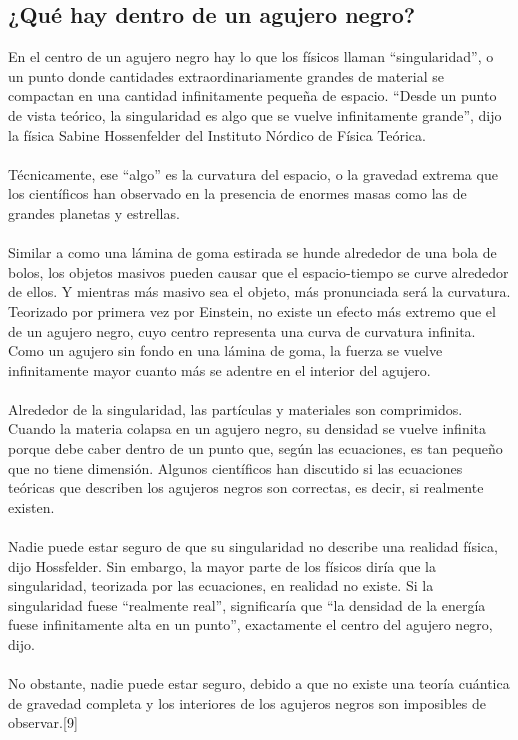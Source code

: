\documentclass[12pt]{article}
\begin{document}
\subsection{¿Qué hay dentro de un agujero negro?}
En el centro de un agujero negro hay lo que los físicos llaman “singularidad”, o un punto donde cantidades extraordinariamente grandes de material se compactan en una cantidad infinitamente pequeña de espacio.
“Desde un punto de vista teórico, la singularidad es algo que se vuelve infinitamente grande”, dijo la física Sabine Hossenfelder del Instituto Nórdico de Física Teórica.\\\\
Técnicamente, ese “algo” es la curvatura del espacio, o la gravedad extrema que los científicos han observado en la presencia de enormes masas como las de grandes planetas y estrellas.\\\\
Similar a como una lámina de goma estirada se hunde alrededor de una bola de bolos, los objetos masivos pueden causar que el espacio-tiempo se curve alrededor de ellos. Y mientras más masivo sea el objeto, más pronunciada será la curvatura. Teorizado por primera vez por Einstein, no existe un efecto más extremo que el de un agujero negro, cuyo centro representa una curva de curvatura infinita. Como un agujero sin fondo en una lámina de goma, la fuerza se vuelve infinitamente mayor cuanto más se adentre en el interior del agujero.\\\\
Alrededor de la singularidad, las partículas y materiales son comprimidos. Cuando la materia colapsa en un agujero negro, su densidad se vuelve infinita porque debe caber dentro de un punto que, según las ecuaciones, es tan pequeño que no tiene dimensión.
Algunos científicos han discutido si las ecuaciones teóricas que describen los agujeros negros son correctas, es decir, si realmente existen.
\\\\
Nadie puede estar seguro de que su singularidad no describe una realidad física, dijo Hossfelder. Sin embargo, la mayor parte de los físicos diría que la singularidad, teorizada por las ecuaciones, en realidad no existe. Si la singularidad fuese “realmente real”, significaría que “la densidad de la energía fuese infinitamente alta en un punto”, exactamente el centro del agujero negro, dijo.
\\\\
No obstante, nadie puede estar seguro, debido a que no existe una teoría cuántica de gravedad completa y los interiores de los agujeros negros son imposibles de observar.[9]
\\%
\end{document}
